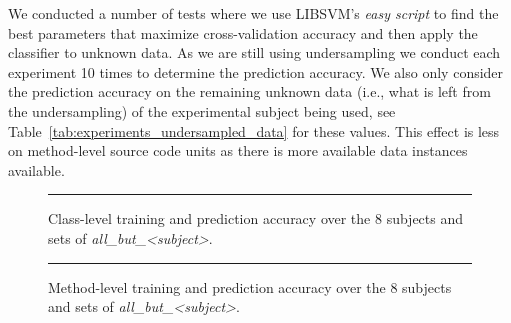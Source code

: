 We conducted a number of tests where we use LIBSVM's \emph{easy script} to find the best parameters that maximize cross-validation accuracy and then apply the classifier to unknown data. As we are still using undersampling we conduct each experiment 10 times to determine the prediction accuracy. We also only consider the prediction accuracy on the remaining unknown data (i.e., what is left from the undersampling) of the experimental subject being used, see Table~\ref{tab:experiments_undersampled_data} for these values. This effect is less on method-level source code units as there is more available data instances available.

\begin{figure}[ht!]
  \centering
  \begin{adjustbox}{max size={.95\textwidth}{.95\textheight}}
    
  \end{adjustbox}
  \caption{Class-level training and prediction accuracy over the 8 subjects and sets of \emph{all\_but\_<subject>}.}
  \vspace{2mm}
  \hrule
  \label{fig:prediction_class_graph}
\end{figure}

\begin{figure}[ht!]
  \centering
  \begin{adjustbox}{max size={.95\textwidth}{.95\textheight}}
    
  \end{adjustbox}
  \caption{Method-level training and prediction accuracy over the 8 subjects and sets of \emph{all\_but\_<subject>}.}
  \vspace{2mm}
  \hrule
  \label{fig:prediction_method_graph}
\end{figure}

